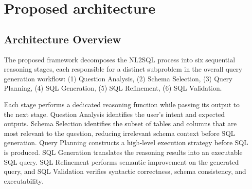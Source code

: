 \documentclass{svproc}
\begin{document}


\section{Proposed architecture}
\label{sec:arch}

\subsection{Architecture Overview}
\label{subsec:arch-overview}

The proposed framework decomposes the NL2SQL process into six sequential reasoning stages, each responsible for a distinct subproblem in the overall query generation workflow: (1) Question Analysis, (2) Schema Selection, (3) Query Planning, (4) SQL Generation, (5) SQL Refinement, (6) SQL Validation.


Each stage performs a dedicated reasoning function while passing its output to the next stage. Question Analysis identifies the user's intent and expected outputs. Schema Selection identifies the subset of tables and columns that are most relevant to the question, reducing irrelevant schema context before SQL generation. Query Planning constructs a high-level execution strategy before SQL is produced. SQL Generation translates the reasoning results into an executable SQL query. SQL Refinement performs semantic improvement on the generated query, and SQL Validation verifies syntactic correctness, schema consistency, and executability.
\end{document}
